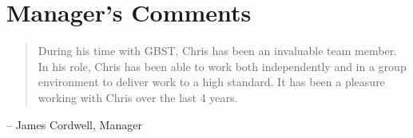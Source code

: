 \chapter{Manager's Comments}

\begin{quote}
During his time with GBST, Chris has been an invaluable team member. In his role, Chris has been able to work both independently and in a group environment to deliver work to a high standard. It has been a pleasure working with Chris over the last 4 years.
\end{quote}
\begin{indent}
-- James Cordwell, Manager
\end{indent}

\begin{comment}
lorem ipsum blah blah blah
\end{comment}
